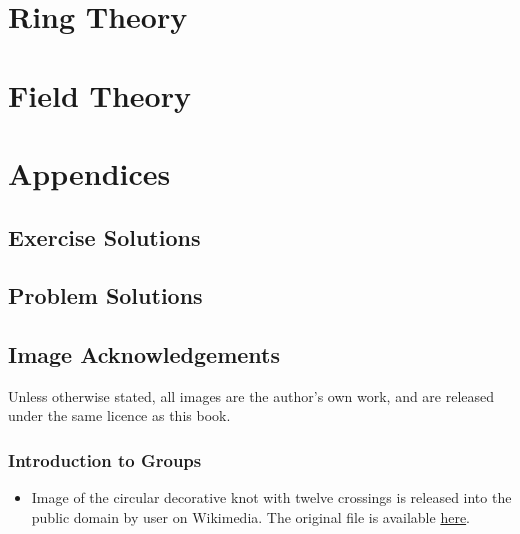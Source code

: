\part{Ring Theory}







\part{Field Theory}

\appendix
{}
\part*{Appendices}

\chapter{Exercise Solutions}




\chapter{Problem Solutions}



\chapter{Image Acknowledgements}
Unless otherwise stated, all images are the author's own work, and are released under the same licence as this book.

\section{Introduction to Groups}
\begin{itemize}
    \item Image of the circular decorative knot with twelve crossings is released into the public domain by user  on Wikimedia. The original file is available \href{https://commons.wikimedia.org/wiki/File:Circular-cross-decorative-knot-12crossings.svg}{here}.
\end{itemize}

